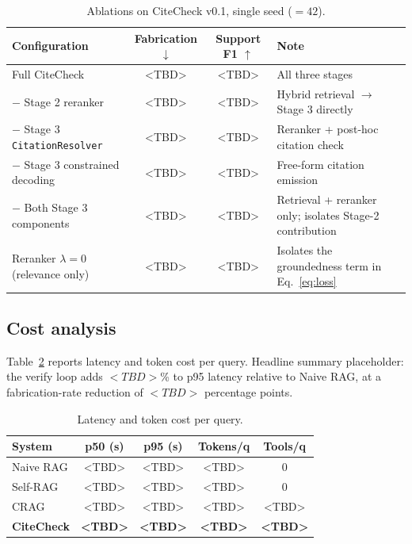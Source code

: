 \documentclass[11pt]{article}
\begin{document}
\begin{table}[t]
\centering
\small
\begin{tabular}{lccp{6cm}}
\toprule
\textbf{Configuration} &
  \textbf{Fabrication $\downarrow$} &
  \textbf{Support F1 $\uparrow$} &
  \textbf{Note} \\
\midrule
Full CiteCheck                                & <TBD> & <TBD>
   & All three stages \\
\quad $-$ Stage 2 reranker                    & <TBD> & <TBD>
   & Hybrid retrieval $\rightarrow$ Stage 3 directly \\
\quad $-$ Stage 3 \texttt{CitationResolver}   & <TBD> & <TBD>
   & Reranker + post-hoc citation check \\
\quad $-$ Stage 3 constrained decoding        & <TBD> & <TBD>
   & Free-form citation emission \\
\quad $-$ Both Stage 3 components             & <TBD> & <TBD>
   & Retrieval + reranker only;
     isolates Stage-2 contribution \\
Reranker $\lambda = 0$ (relevance only)       & <TBD> & <TBD>
   & Isolates the groundedness term in Eq.~\ref{eq:loss} \\
\bottomrule
\end{tabular}
\caption{Ablations on CiteCheck v0.1, single seed ($=42$).}
\label{tab:ablations}
\end{table}

\subsection{Cost analysis}
\label{sec:results:cost}

Table~\ref{tab:cost} reports latency and token cost per query.
Headline summary placeholder: the verify loop adds $<TBD>$\% to p95
latency relative to Naive RAG, at a fabrication-rate reduction of
$<TBD>$ percentage points.

\begin{table}[t]
\centering
\small
\begin{tabular}{lcccc}
\toprule
\textbf{System} & \textbf{p50 (s)} & \textbf{p95 (s)}
                & \textbf{Tokens/q} & \textbf{Tools/q} \\
\midrule
Naive RAG              & <TBD> & <TBD> & <TBD> & 0     \\
Self-RAG               & <TBD> & <TBD> & <TBD> & 0     \\
CRAG                   & <TBD> & <TBD> & <TBD> & <TBD> \\
\textbf{CiteCheck}     & \textbf{<TBD>} & \textbf{<TBD>}
                       & \textbf{<TBD>} & \textbf{<TBD>} \\
\bottomrule
\end{tabular}
\caption{Latency and token cost per query.}
\label{tab:cost}
\end{table}
\end{document}
